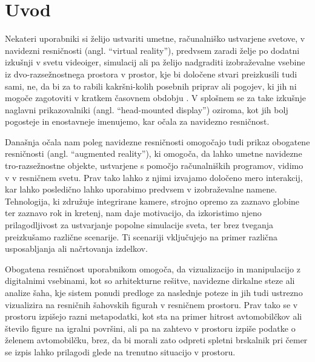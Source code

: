 \documentclass[a4paper, 12pt]{book}
\begin{document}
\chapter{Uvod}
\label{ch:uvod}
Nekateri uporabniki si želijo ustvariti umetne, računalniško ustvarjene svetove, v navidezni resničnosti (angl. ``virtual reality''), predvsem zaradi želje po dodatni izkušnji v svetu videoiger, simulacij ali pa želijo nadgraditi izobraževalne vsebine iz dvo-razsežnostnega prostora v prostor, kje bi določene stvari preizkusili tudi sami, ne, da bi za to rabili kakršni-kolih posebnih priprav ali pogojev, ki jih ni mogoče zagotoviti v kratkem časovnem obdobju \cite{Qingtian2024}. V splošnem se za take izkušnje naglavni prikazovalniki (angl. ``head-mounted display'') oziroma, kot jih bolj pogosteje in enostavneje imenujemo, kar očala za navidezno resničnost.

Današnja očala nam poleg navidezne resničnosti omogočajo tudi prikaz obogatene resničnosti (angl. ``augmented reality''), ki omogoča, da lahko umetne navidezne tro-razsežnostne objekte, ustvarjene s pomočjo računalniških programov, vidimo v v resničnem svetu. Prav tako lahko z njimi izvajamo določeno mero interakcij, kar lahko posledično lahko uporabimo predvsem v izobraževalne namene. Tehnologija, ki združuje integrirane kamere, strojno opremo za zaznavo globine ter zaznavo rok in kretenj, nam daje motivacijo, da izkoristimo njeno prilagodljivost za ustvarjanje popolne simulacije sveta, ter brez tveganja preizkušamo različne scenarije. Ti scenariji vključujejo na primer različna usposabljanja ali načrtovanja izdelkov.

Obogatena resničnost uporabnikom omogoča, da vizualizacijo in manipulacijo z digitalnimi vsebinami, kot so arhitekturne rešitve, navidezne dirkalne steze ali analize šaha, kje sistem ponudi predloge za naslednje poteze in jih tudi ustrezno vizualizira na resničnih šahovskih figurah v resničnem prostoru. Prav tako se v prostoru izpišejo razni metapodatki, kot sta na primer hitrost avtomobilčkov ali število figure na igralni površini, ali pa na zahtevo v prostoru izpiše podatke o želenem avtomobilčku, brez, da bi morali zato odpreti spletni brskalnik pri čemer se izpis lahko prilagodi glede na trenutno situacijo v prostoru. 
\end{document}
